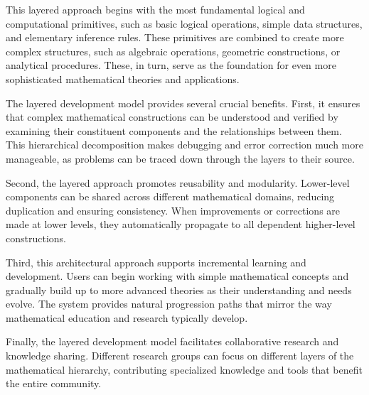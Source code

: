 This layered approach begins with the most fundamental logical and computational primitives, such as basic logical operations, simple data structures, and elementary inference rules.
These primitives are combined to create more complex structures, such as algebraic operations, geometric constructions, or analytical procedures.
These, in turn, serve as the foundation for even more sophisticated mathematical theories and applications.

The layered development model provides several crucial benefits.
First, it ensures that complex mathematical constructions can be understood and verified by examining their constituent components and the relationships between them.
This hierarchical decomposition makes debugging and error correction much more manageable, as problems can be traced down through the layers to their source.

Second, the layered approach promotes reusability and modularity.
Lower-level components can be shared across different mathematical domains, reducing duplication and ensuring consistency.
When improvements or corrections are made at lower levels, they automatically propagate to all dependent higher-level constructions.

Third, this architectural approach supports incremental learning and development.
Users can begin working with simple mathematical concepts and gradually build up to more advanced theories as their understanding and needs evolve.
The system provides natural progression paths that mirror the way mathematical education and research typically develop.

Finally, the layered development model facilitates collaborative research and knowledge sharing.
Different research groups can focus on different layers of the mathematical hierarchy, contributing specialized knowledge and tools that benefit the entire community.